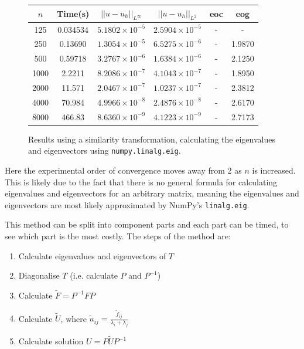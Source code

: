 \documentclass{article}
\numberwithin{equation}{section}
\begin{document}
\begin{figure}[H]
\centering
\begin{tabular}{|c|c|c|c|c|c|}
\hline
$n$ & Time(s) & $|| u - u_h ||_{L^{\infty}}$ &$|| u - u_h ||_{L^{2}}$ & eoc & eog \\
\hline
125 & 0.034534 & $5.1802 \times 10^{-5}$ & $2.5904 \times 10^{-5}$ & -  & - \\
250 & 0.13690 & $1.3054 \times 10^{-5}$ & $6.5275 \times 10^{-6}$ & - & 1.9870  \\
500 & 0.59718 & $3.2767 \times 10^{-6}$ & $1.6384 \times 10^{-6}$ & - & 2.1250  \\
1000 & 2.2211 & $8.2086 \times 10^{-7}$ & $4.1043 \times 10^{-7}$ & - & 1.8950  \\
2000 & 11.571 & $2.0467 \times 10^{-7}$ & $1.0237 \times 10^{-7}$ & - & 2.3812  \\
4000 & 70.984 & $4.9966 \times 10^{-8}$ & $2.4876 \times 10^{-8}$ & - & 2.6170  \\
8000 & 466.83 & $8.6360 \times 10^{-9}$ & $4.1223 \times 10^{-9}$ & - & 2.7173  \\
\hline
\end{tabular}
\captionsetup{justification=centering}
\caption{Results using a similarity transformation, calculating the eigenvalues and eigenvectors using \texttt{numpy.linalg.eig}.}
\end{figure}

Here the experimental order of convergence moves away from 2 as $n$ is increased. This is likely due to the fact that there is no general formula for calculating eigenvalues and eigenvectors for an arbitrary matrix, meaning the eigenvalues and eigenvectors are most likely approximated by NumPy's \texttt{linalg.eig}.

This method can be split into component parts and each part can be timed, to see which part is the most costly. The steps of the method are:
\begin{enumerate}
\item Calculate eigenvalues and eigenvectors of $T$
\item Diagonalise $T$ (i.e. calculate $P$ and $P^{-1}$)
\item Calculate $\tilde{F}=P^{-1}FP$
\item Calculate $\tilde{U}$, where $\tilde{u}_{ij} = \frac{\tilde{f}_{ij}}{\lambda_i + \lambda_j}$
\item Calculate solution $U=P \tilde{U}P^{-1}$
\end{enumerate}
\end{document}
